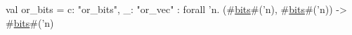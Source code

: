val or_bits = {c: "or_bits", _: "or_vec"} : forall 'n. (#\hyperref[zbits]{bits}#('n), #\hyperref[zbits]{bits}#('n)) -> #\hyperref[zbits]{bits}#('n)
